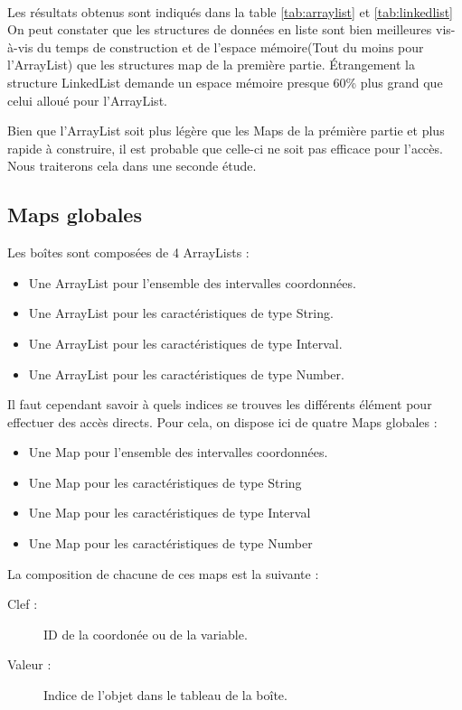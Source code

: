\paragraph{}Les résultats obtenus sont indiqués dans la table \ref{tab:arraylist} et \ref{tab:linkedlist}
On peut constater que les structures de données en liste sont bien meilleures vis-à-vis du temps de construction et de l'espace mémoire(Tout du moins pour l'ArrayList) que les structures map de la première partie. Étrangement la structure LinkedList demande un espace mémoire presque 60\% plus grand que celui alloué pour l'ArrayList.

Bien que l'ArrayList soit plus légère que les Maps de la prémière partie et plus rapide à construire, il est probable que celle-ci ne soit pas efficace pour l'accès. Nous traiterons cela dans une seconde étude.

\subsection{Maps globales}
Les boîtes sont composées  de 4 ArrayLists : 
\begin{itemize}
  \item Une ArrayList pour l'ensemble des intervalles coordonnées.
  \item Une ArrayList pour les caractéristiques de type String.
  \item Une ArrayList pour les caractéristiques de type Interval.
  \item Une ArrayList pour les caractéristiques de type Number.
\end{itemize}
Il faut cependant savoir à quels indices se trouves les différents élément pour effectuer des accès directs. Pour cela, on dispose ici de quatre Maps globales :
\begin{itemize}
  \item Une Map pour l'ensemble des intervalles coordonnées.
  \item Une Map pour les caractéristiques de type String
  \item Une Map pour les caractéristiques de type Interval
  \item Une Map pour les caractéristiques de type Number
\end{itemize}
La composition de chacune de ces maps est la suivante :  
\begin{description}
 \item[Clef :]
ID de la coordonée ou de la variable.
\item[Valeur :]
Indice de l'objet dans le tableau de la boîte.
\end{description}


